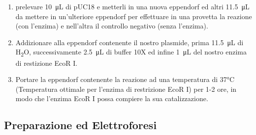 \begin{enumerate}

	\item prelevare \SI{10}{\micro\liter} di pUC18 e metterli in una nuova eppendorf
	ed altri \SI{11.5}{\micro\liter} da mettere in un'ulteriore eppendorf per effettuare in
	una provetta la reazione (con l'enzima) e nell'altra il controllo negativo (senza l'enzima).

	\item Addizionare alla eppendorf contenente il nostro plasmide,
	prima \SI{11.5}{\micro\liter} di H\textsubscript{2}O, successivamente
	\SI{2.5}{\micro\liter} di buffer 10X ed infine \SI{1}{\micro\liter} del nostro enzima di restizione EcoR I.

	\item Portare la eppendorf contenente la reazione ad una temperatura di 37°C
	(Temperatura ottimale per l'enzima di restrizione EcoR I) per 1-2 ore,
	in modo che l'enzima EcoR I possa compiere la sua catalizzazione.

\end{enumerate}

\subsection{Preparazione ed Elettroforesi}


